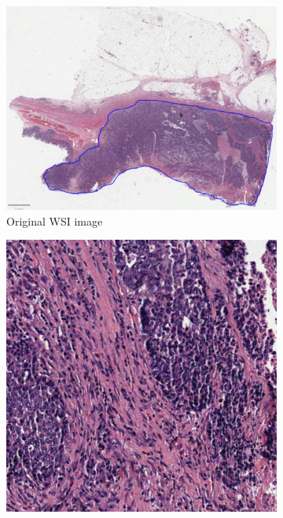 \documentclass[peerreview]{IEEEtran}
\begin{document}
\begin{figure}
    \centering
    \begin{subfigure}[b]{0.36\textwidth}
        \centering
        \includegraphics[width=\textwidth]{figure/1svs.png}
        \caption{Original WSI image}
        \label{fig:1svs}
    \end{subfigure}
    \hfill
    \begin{subfigure}[b]{0.26\textwidth}
        \centering
        \includegraphics[width=\textwidth]{figure/cpatch.png}

\end{subfigure}
\end{figure}
\end{document}
